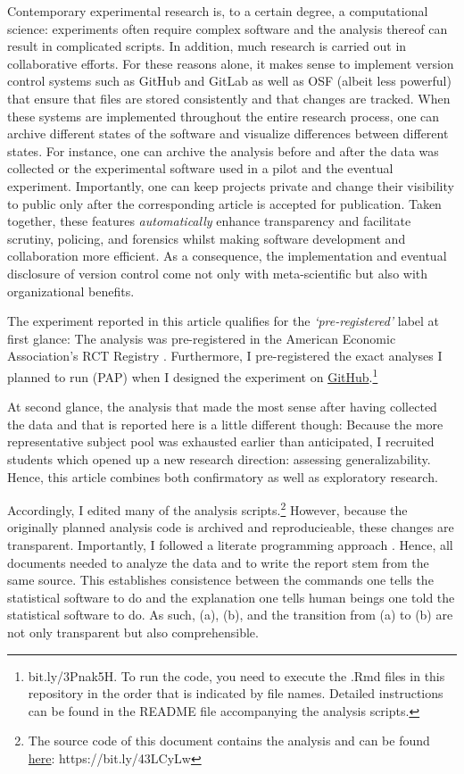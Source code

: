 \documentclass[
  authoryear,
  review,
  3p,
  onecolumn]{elsarticle}
\begin{document}
Contemporary experimental research is, to a certain degree, a
computational science: experiments often require complex software and
the analysis thereof can result in complicated scripts. In addition,
much research is carried out in collaborative efforts. For these reasons
alone, it makes sense to implement version control systems such as
GitHub and GitLab as well as OSF (albeit less powerful) that ensure that
files are stored consistently and that changes are tracked. When these
systems are implemented throughout the entire research process, one can
archive different states of the software and visualize differences
between different states. For instance, one can archive the analysis
before and after the data was collected or the experimental software
used in a pilot and the eventual experiment. Importantly, one can keep
projects private and change their visibility to public only after the
corresponding article is accepted for publication. Taken together, these
features \emph{automatically} enhance transparency and facilitate
scrutiny, policing, and forensics whilst making software development and
collaboration more efficient. As a consequence, the implementation and
eventual disclosure of version control come not only with
meta-scientific but also with organizational benefits.

The experiment reported in this article qualifies for the
\emph{`pre-registered'} label at first glance: The analysis was
pre-registered in the American Economic Association's RCT Registry
\citep{preregistration}. Furthermore, I pre-registered the exact
analyses I planned to run (PAP) when I designed the experiment on
\href{https://github.com/Howquez/GMTV/tree/July21Replication/analysis/R}{GitHub}.\footnote{bit.ly/3Pnak5H.
  To run the code, you need to execute the .Rmd files in this repository
  in the order that is indicated by file names. Detailed instructions
  can be found in the README file accompanying the analysis scripts.}

At second glance, the analysis that made the most sense after having
collected the data and that is reported here is a little different
though: Because the more representative subject pool was exhausted
earlier than anticipated, I recruited students which opened up a new
research direction: assessing generalizability. Hence, this article
combines both confirmatory as well as exploratory research.

Accordingly, I edited many of the analysis scripts.\footnote{The source
  code of this document contains the analysis and can be found
  \href{https://github.com/Howquez/GMTV/blob/main/analysis/article/paper.qmd}{here}:
  https://bit.ly/43LCyLw} However, because the originally planned
analysis code is archived and reproducieable, these changes are
transparent. Importantly, I followed a literate programming approach
\citep{Knuth_1984, AkhtarYe_2023}. Hence, all documents needed to
analyze the data and to write the report stem from the same source. This
establishes consistence between the commands one tells the statistical
software to do and the explanation one tells human beings one told the
statistical software to do. As such, (a), (b), and the transition from
(a) to (b) are not only transparent but also comprehensible.
\end{document}
